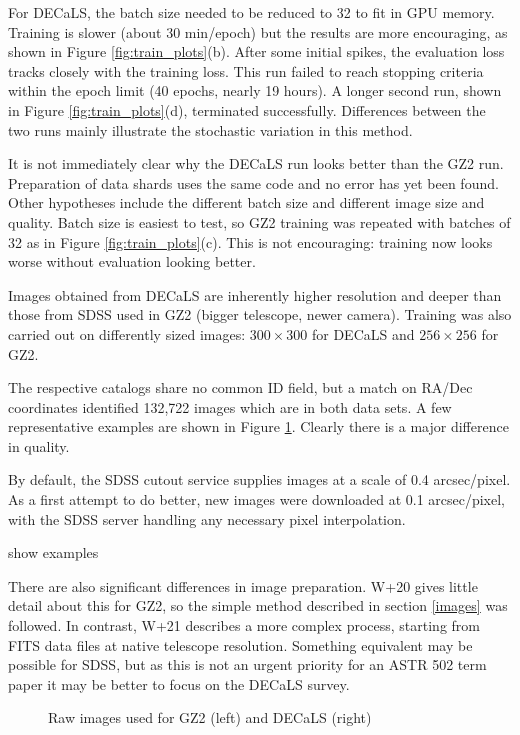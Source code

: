 \documentclass[preprint]{aastex631}
\newcommand{\todo}{\color{red}{TODO}\color{black}\hspace{2mm}}
\begin{document}
For DECaLS, the batch size needed to be reduced to 32 to fit in GPU memory. Training is slower (about 30 min/epoch) but the results are more encouraging, as shown in Figure \ref{fig:train_plots}(b). After some initial spikes, the evaluation loss tracks closely with the training loss. This run failed to reach stopping criteria within the epoch limit (40 epochs, nearly 19 hours). A longer second run, shown in Figure \ref{fig:train_plots}(d), terminated successfully. Differences between the two runs mainly illustrate the stochastic variation in this method.

It is not immediately clear why the DECaLS run looks better than the GZ2 run. Preparation of data shards uses the same code and no error has yet been found. Other hypotheses include the different batch size and different image size and quality. Batch size is easiest to test, so GZ2 training was repeated with batches of 32 as in Figure \ref{fig:train_plots}(c). This is not encouraging: training now looks worse without evaluation looking better.

Images obtained from DECaLS are inherently higher resolution and deeper than those from SDSS used in GZ2 (bigger telescope, newer camera). Training was also carried out on differently sized images: $300 \times 300$ for DECaLS and $256 \times256$ for GZ2.

The respective catalogs share no common ID field, but a match on RA/Dec coordinates identified 132,722 images which are in both data sets. A few representative examples are shown in Figure \ref{fig:images}. Clearly there is a major difference in quality.

By default, the SDSS cutout service supplies images at a scale of 0.4 arcsec/pixel. As a first attempt to do better, new images were downloaded at 0.1 arcsec/pixel, with the SDSS server handling any necessary pixel interpolation.

\todo show examples

There are also significant differences in image preparation. W+20 gives little detail about this for GZ2, so the simple method described in section \ref{images} was followed.  In contrast, W+21 describes a more complex process, starting from FITS data files at native telescope resolution. Something equivalent may be possible for SDSS, but as this is not an urgent priority for an ASTR 502 term paper it may be better to focus on the DECaLS survey.


\begin{figure}
	\caption{Raw images used for GZ2 (left) and DECaLS (right) \label{fig:images}}
\end{figure}
\end{document}
